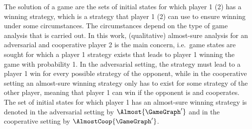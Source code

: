     The solution of a game are the sets of initial states for which player 1 (2) has a winning strategy, which is a strategy that player 1 (2) can use to ensure winning under some circumstances.
    The circumstances depend on the type of game analysis that is carried out.
    In this work, (qualitative) almost-sure analysis for an adversarial and cooperative player 2 is the main concern, i.e.\ game states are sought for which a player 1 strategy exists that leads to player 1 winning the game with probability 1.
    In the adversarial setting, the strategy must lead to a player 1 win for every possible strategy of the opponent, while in the cooperative setting an almost-sure winning strategy only has to exist for some strategy of the other player, meaning that player 1 can win if the opponent is  and cooperates.
    The set of initial states for which player 1 has an almost-sure winning strategy is denoted in the adversarial setting by $\Almost{\GameGraph'}$ and in the cooperative setting by $\AlmostCoop{\GameGraph'}$.

\stopsubsection

